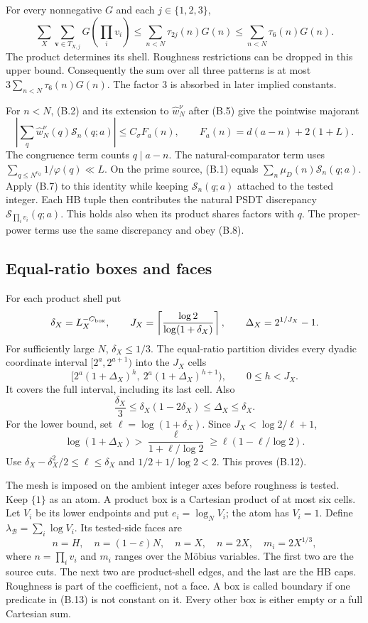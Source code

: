 For every nonnegative $G$ and each $j\in\{1,2,3\}$,
\[
 \sum_X\sum_{\mathbf v\in T_{X,j}}G\!\left(\prod_i v_i\right)
 \le\sum_{n<N}\tau_{2j}(n)G(n)
 \le\sum_{n<N}\tau_6(n)G(n).
 \tag{B.11}
\]
The product determines its shell. Roughness restrictions can be
dropped in this upper bound. Consequently the sum over all three
patterns is at most $3\sum_{n<N}\tau_6(n)G(n)$. The factor $3$
is absorbed in later implied constants.

For $n<N$, (B.2) and its extension to $\widehat w_N^\nu$ after (B.5)
give the pointwise majorant
\[
\left|\sum_q\widehat w_N^\nu(q)\mathcal S_n(q;a)\right|
 \le C_\sigma F_a(n),\qquad
 F_a(n)=d(a-n)+2(1+L).
 \tag*{}
\]
The congruence term counts $q\mid a-n$. The natural-comparator term
uses $\sum_{q\le N^{e_Q}}1/\varphi(q)\ll L$. On the prime source,
(B.1) equals $\sum_n\mu_D(n)\mathcal S_n(q;a)$. Apply (B.7) to this
identity while keeping $\mathcal S_n(q;a)$ attached to the tested
integer. Each HB tuple then contributes the natural PSDT discrepancy
$\mathcal S_{\prod_i v_i}(q;a)$. This holds also when its product
shares factors with $q$. The proper-power terms use the same discrepancy and
obey (B.8).

\subsection*{Equal-ratio boxes and faces}

For each product shell put
\[
 \delta_X=L_X^{-C_{\rm box}},\qquad
 J_X=\left\lceil\frac{\log2}{\log(1+\delta_X)}\right\rceil,
 \qquad \Delta_X=2^{1/J_X}-1.
\]
For sufficiently large $N$, $\delta_X\le1/3$. The equal-ratio
partition divides every dyadic coordinate interval $[2^a,2^{a+1})$
into the $J_X$ cells
\[
 [2^a(1+\Delta_X)^h,\ 2^a(1+\Delta_X)^{h+1}),
 \qquad 0\le h<J_X.
\]
It covers the full interval, including its last cell. Also
\[
 \frac{\delta_X}{3}\le\delta_X(1-2\delta_X)
 \le\Delta_X\le\delta_X.
 \tag{B.12}
\]
For the lower bound, set $\ell=\log(1+\delta_X)$. Since
$J_X<\log2/\ell+1$,
\[
 \log(1+\Delta_X)>\frac{\ell}{1+\ell/\log2}
 \ge\ell(1-\ell/\log2).
\]
Use $\delta_X-\delta_X^2/2\le\ell\le\delta_X$ and
$1/2+1/\log2<2$. This proves (B.12).

The mesh is imposed on the ambient integer axes before roughness is
tested. Keep $\{1\}$ as an atom. A product box is a Cartesian product
of at most six cells. Let $V_i$ be its lower endpoints and put
$e_i=\log_N V_i$; the atom has $V_i=1$. Define
$\lambda_{\mathcal B}=\sum_i\log V_i$. Its tested-side faces are
\[
 n=H,\quad n=(1-\varepsilon)N,\quad n=X,\quad n=2X,\quad m_i=2X^{1/3},
 \tag{B.13}
\]
where $n=\prod_i v_i$ and $m_i$ ranges over the Möbius variables.
The first two are the source cuts. The next two are product-shell
edges, and the last are the HB caps. Roughness is part of the
coefficient, not a face. A box is called boundary if one predicate in
(B.13) is not constant on it. Every other box is either empty or a
full Cartesian sum.

